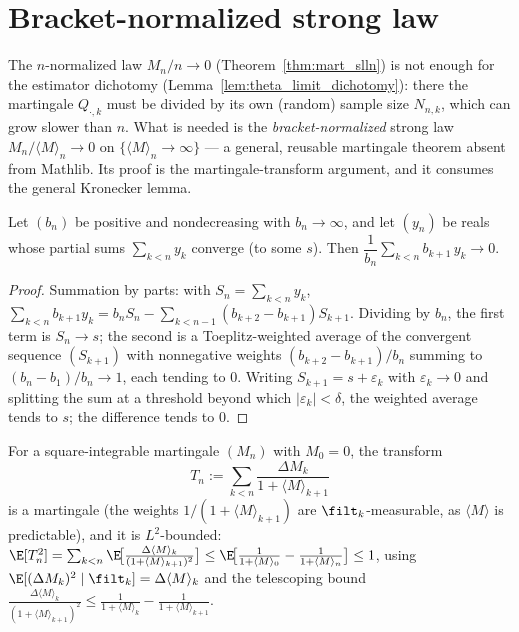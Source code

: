 \section{Bracket-normalized strong law}
\label{sec:pre_slln_bracket}

The $n$-normalized law $M_n/n\to0$ (Theorem~\ref{thm:mart_slln}) is not enough for the estimator
dichotomy (Lemma~\ref{lem:theta_limit_dichotomy}): there the martingale $Q_{\cdot,k}$ must be divided
by its own (random) sample size $N_{n,k}$, which can grow slower than $n$. What is needed is the
\emph{bracket-normalized} strong law $M_n/\langle M\rangle_n\to0$ on $\{\langle M\rangle_n\to\infty\}$
--- a general, reusable martingale theorem absent from Mathlib. Its proof is the martingale-transform
argument, and it consumes the general Kronecker lemma.

\begin{lemma}\label{lem:kronecker_general}
\leanok
Let $(b_n)$ be positive and nondecreasing with $b_n\to\infty$, and let $(y_n)$ be reals whose partial
sums $\sum_{k<n} y_k$ converge (to some $s$). Then $\dfrac1{b_n}\sum_{k<n} b_{k+1}\,y_k \to 0$.
\end{lemma}

\begin{proof}\leanok
Summation by parts: with $S_n=\sum_{k<n}y_k$,
$\sum_{k<n} b_{k+1}y_k = b_n S_n - \sum_{k<n-1}(b_{k+2}-b_{k+1})S_{k+1}$. Dividing by $b_n$, the first
term is $S_n\to s$; the second is a Toeplitz-weighted average of the convergent sequence
$(S_{k+1})$ with nonnegative weights $(b_{k+2}-b_{k+1})/b_n$ summing to $(b_n-b_1)/b_n\to1$, each
tending to $0$. Writing $S_{k+1}=s+\varepsilon_k$ with $\varepsilon_k\to0$ and splitting the sum at a
threshold beyond which $|\varepsilon_k|<\delta$, the weighted average tends to $s$; the difference
tends to $0$.
\end{proof}

\begin{lemma}\label{lem:slln_bracket_weighted}
\leanok
{}
For a square-integrable martingale $(M_n)$ with $M_0=0$, the transform
\[
  T_n := \sum_{k<n} \frac{\Delta M_k}{1+\langle M\rangle_{k+1}}
\]
is a martingale (the weights $1/(1+\langle M\rangle_{k+1})$ are $\filt_k$-measurable, as
$\langle M\rangle$ is predictable), and it is $L^2$-bounded:
$\E[T_n^2] = \sum_{k<n} \E\!\big[\tfrac{\Delta\langle M\rangle_k}{(1+\langle M\rangle_{k+1})^2}\big]
\le \E\!\big[\tfrac1{1+\langle M\rangle_0}-\tfrac1{1+\langle M\rangle_n}\big] \le 1$,
using $\E[(\Delta M_k)^2\mid\filt_k]=\Delta\langle M\rangle_k$ and the telescoping bound
$\tfrac{\Delta\langle M\rangle_k}{(1+\langle M\rangle_{k+1})^2}\le
\tfrac1{1+\langle M\rangle_k}-\tfrac1{1+\langle M\rangle_{k+1}}$.
\end{lemma}

